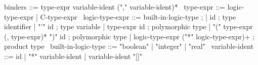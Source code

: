 \begin{syntax}
  binders ::= type-expr variable-ident ("," variable-ident)*
  \
  type-expr ::= logic-type-expr | C-type-expr
  \
  logic-type-expr ::= built-in-logic-type ;
  | id ; type identifier
  | "'" id ; type variable
  | type-expr id ; polymorphic type                 
  | "(" type-expr (, type-expr)* ")" id ; polymorphic type
  | logic-type-expr ("*" logic-type-expr)+  ; \experimental product type 
  \
  built-in-logic-type ::= "boolean" | "integer" | "real" 
  \
  variable-ident ::= id 
  | "*" variable-ident 
  | variable-ident "[]"
\end{syntax}